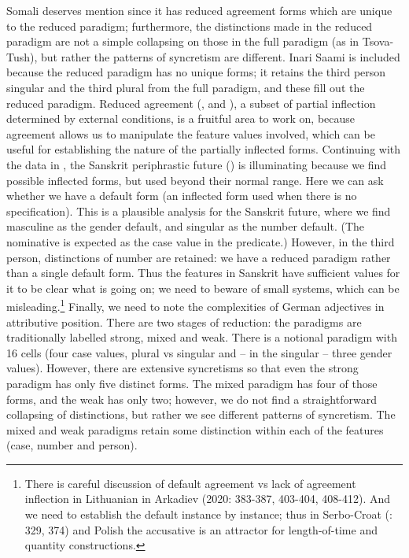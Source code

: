 \documentclass[output=paper]{langscibook}
\begin{document}
Somali deserves mention since it has reduced agreement forms which are unique to the reduced paradigm; furthermore, the distinctions made in the reduced paradigm are not a simple collapsing on those in the full paradigm (as in Tsova-Tush), but rather the patterns of syncretism are different. Inari Saami is included because the reduced paradigm has no unique forms; it retains the third person singular and the third plural from the full paradigm, and these fill out the reduced paradigm. Reduced agreement (\citealt{FeddenPaciaroni2022}, and \citealt{Loporcaro2025}), a subset of partial inflection determined by external conditions, is a fruitful area to work on, because agreement allows us to manipulate the feature values involved, which can be useful for establishing the nature of the partially inflected forms. Continuing with the data in , the Sanskrit periphrastic future () is illuminating because we find possible inflected forms, but used beyond their normal range. Here we can ask whether we have a default form (an inflected form used when there is no specification). This is a plausible analysis for the Sanskrit future, where we find masculine as the gender default, and singular as the number default. (The nominative is expected as the case value in the predicate.) However, in the third person, distinctions of number are retained: we have a reduced paradigm rather than a single default form. Thus the features in Sanskrit have sufficient values for it to be clear what is going on; we need to beware of small systems, which can be misleading.\footnote{ \textrm{There is careful discussion of default agreement vs lack of agreement inflection in Lithuanian in Arkadiev (2020: 383-387, 403-404, 408-412). And we need to establish the default instance by instance; thus in Serbo-Croat (\citealt{Browne1993a}: 329, 374) and Polish the accusative is an attractor for length-of-time and quantity constructions.}} Finally, we need to note the complexities of German adjectives in attributive position. There are two stages of reduction: the paradigms are traditionally labelled strong, mixed and weak. There is a notional paradigm with 16 cells (four case values, plural vs singular and – in the singular – three gender values). However, there are extensive syncretisms so that even the strong paradigm has only five distinct forms. The mixed paradigm has four of those forms, and the weak has only two; however, we do not find a straightforward collapsing of distinctions, but rather we see different patterns of syncretism. The mixed and weak paradigms retain some distinction within each of the features (case, number and person).
\end{document}
